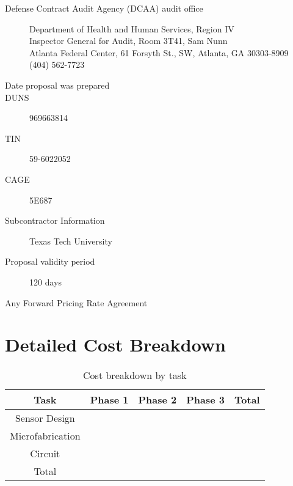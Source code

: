 \begin{description}
\item [Defense Contract Audit Agency (DCAA) audit office]
  \begin{description}
  \item [Department of Health and Human Services, Region IV]
  \item [Inspector General for Audit, Room 3T41, Sam Nunn]
  \item [Atlanta Federal Center, 61 Forsyth St., SW, Atlanta, GA 30303-8909]
  \item [(404) 562-7723]
  \end{description}
\item [Date proposal was prepared]
\item [DUNS] 969663814
\item [TIN] 59-6022052
\item [CAGE] 5E687
\item [Subcontractor Information] Texas Tech University
\item [Proposal validity period] 120 days
\item [Any Forward Pricing Rate Agreement]
  
\end{description}

\section{Detailed Cost Breakdown}
\begin{table}[h!]
  \centering
  \begin{tabular}{|c||c|c|c|c|}
    \hline
    Task & Phase 1 & Phase 2 & Phase 3 & Total\\
    \hline
    \hline
    Sensor Design & & & & \\
    \hline
    Microfabrication & & & & \\
    \hline
    Circuit & & & & \\
    \hline
    Total & & & & \\
    \hline
  \end{tabular}
  \caption{Cost breakdown by task}
  \label{tab:taskcost}
\end{table}

